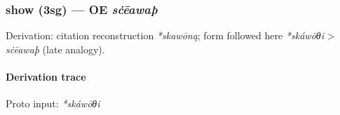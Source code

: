 \documentclass[
  british,
  a4paper,
]{article}
\begin{document}
\subsubsection{\texorpdfstring{show (3sg) --- OE
\emph{sċēawaþ}}{show (3sg) --- OE sċēawaþ}}\label{show-3sg-oe-sux10bux113awauxfe}

Derivation: citation reconstruction \emph{*skawōną}; form followed here
\emph{*skáwōθi} \textgreater{} \emph{sċēawaþ} (late analogy).

\paragraph{Derivation trace}\label{derivation-trace-149}

Proto input: \emph{*skáwōθi}

\begingroup
\setlength{\fboxsep}{6pt}
\end{document}
